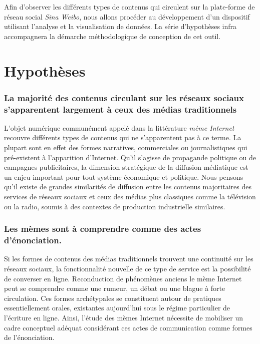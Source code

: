 Afin d'observer les différents types de contenus qui circulent sur la plate-forme de réseau social \textit{Sina Weibo}, nous allons procéder au développement d'un dispositif utilisant l'analyse et la visualisation de données. La série d'hypothèses infra accompagnera la démarche méthodologique de conception de cet outil.

\section*{Hypothèses}
\label{sec:hypotheses}

\subsubsection{La majorité des contenus circulant sur les réseaux sociaux s'apparentent largement à ceux des médias traditionnels}

L'objet numérique communément appelé dans la littérature \textit{mème Internet} recouvre différents types de contenus qui ne s'apparentent pas à ce terme. La plupart sont en effet des formes narratives, commerciales ou journalistiques qui pré-existent à l'apparition d'Internet. Qu{\textquoteright}il s{\textquoteright}agisse de propagande politique ou de campagnes publicitaires, la dimension stratégique de la diffusion médiatique est un enjeu important pour tout système économique et politique. Nous pensons qu{\textquoteright}il existe de grandes similarités de diffusion entre les contenus majoritaires des services de réseaux sociaux et ceux des médias plus classiques comme la télévision ou la radio, soumis à des contextes de production industrielle similaires.

\subsubsection{Les mèmes sont à comprendre comme des actes d'énonciation.}

Si les formes de contenus des médias traditionnels trouvent une continuité sur les réseaux sociaux, la fonctionnalité nouvelle de ce type de service est la possibilité de converser en ligne. Reconduction de phénomènes anciens le mème Internet peut se comprendre comme une rumeur, un débat ou une blague à forte circulation. Ces formes archétypales se constituent autour de pratiques essentiellement orales, existantes aujourd'hui sous le régime particulier de l'écriture en ligne. Ainsi, l'étude des mèmes Internet nécessite de mobiliser un cadre conceptuel adéquat considérant ces actes de communication comme formes de l'énonciation.


